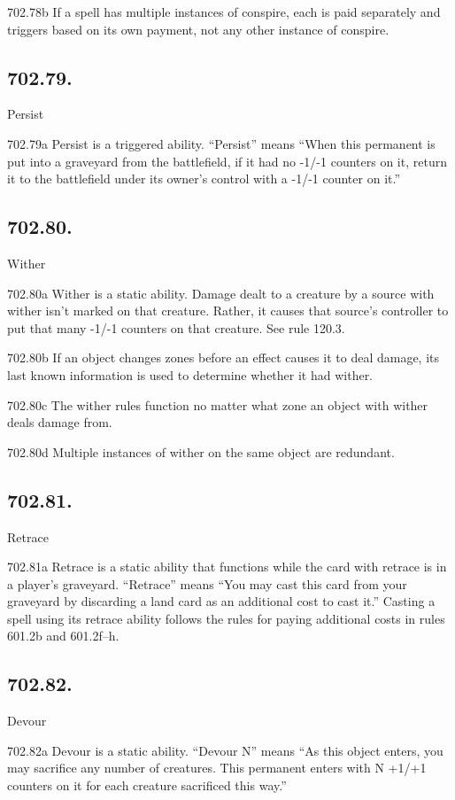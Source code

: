 702.78b If a spell has multiple instances of conspire, each is paid separately and triggers based on its own payment, not any other instance of conspire.

\subsection*{702.79.}
Persist

702.79a Persist is a triggered ability. “Persist” means “When this permanent is put into a graveyard from the battlefield, if it had no -1/-1 counters on it, return it to the battlefield under its owner’s control with a -1/-1 counter on it.”

\subsection*{702.80.}
Wither

702.80a Wither is a static ability. Damage dealt to a creature by a source with wither isn’t marked on that creature. Rather, it causes that source’s controller to put that many -1/-1 counters on that creature. See rule 120.3.

702.80b If an object changes zones before an effect causes it to deal damage, its last known information is used to determine whether it had wither.

702.80c The wither rules function no matter what zone an object with wither deals damage from.

702.80d Multiple instances of wither on the same object are redundant.

\subsection*{702.81.}
Retrace

702.81a Retrace is a static ability that functions while the card with retrace is in a player’s graveyard. “Retrace” means “You may cast this card from your graveyard by discarding a land card as an additional cost to cast it.” Casting a spell using its retrace ability follows the rules for paying additional costs in rules 601.2b and 601.2f–h.

\subsection*{702.82.}
Devour

702.82a Devour is a static ability. “Devour N” means “As this object enters, you may sacrifice any number of creatures. This permanent enters with N +1/+1 counters on it for each creature sacrificed this way.”

